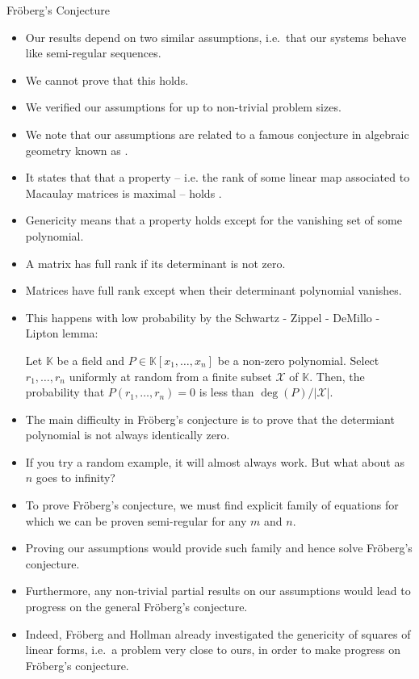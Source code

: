 \documentclass[10pt]{beamer}
\newcommand{\cemph}[1]{{\color{yellow9}{\bf #1}}\xspace}
\begin{document}
\begin{frame}[allowframebreaks]{Fröberg's Conjecture}

\begin{itemize}
  \item Our results depend on two similar assumptions, i.e.\ that our systems behave like semi-regular sequences.
  \item We cannot prove that this holds.
  \item We \cemph{experimentally} verified our assumptions for up to non-trivial problem sizes.
  \item We note that our assumptions are related to a famous conjecture in algebraic geometry known as \cemph{Fr\"oberg's conjecture}.
  \item It states that that a property -- i.e. the rank of some linear map associated to Macaulay matrices is maximal -- holds \cemph{generically}.
  \item Genericity means that a property holds except for the vanishing set of some polynomial.
\framebreak
  \item A matrix has full rank if its determinant is not zero.
  \item Matrices have full rank except when their determinant polynomial vanishes.
  \item This happens with low probability by the Schwartz - Zippel - DeMillo - Lipton lemma:
\begin{lemma}\label{sz}
Let \(\mathbb{K}\) be a  field and \(P\in\mathbb{K}[x_{1},\ldots,x_{n}]\) be a non-zero polynomial. Select \(r_{1},\ldots,r_{n}\) uniformly at random from a finite subset \(\mathcal{X}\) of \(\mathbb{K}\). Then, the probability that \(P(r_{1},\ldots,r_{n})=0\) is less than \(\deg(P)/|\mathcal{X}|\).
\end{lemma}
\framebreak
\item The main difficulty in Fr\"oberg's conjecture is to prove that the determiant polynomial is not always identically zero.
\item If you try a random example, it will almost always work. But what about as $n$ goes to infinity?
\item To prove Fr\"oberg's conjecture, we must find \cemph{one} explicit family of equations for which we can be proven semi-regular for any $m$ and $n$. 

\framebreak
\item Proving our assumptions would provide such family and hence solve Fr\"oberg's conjecture.
\item Furthermore, any non-trivial partial results on our assumptions would lead to progress on the general Fr\"oberg's conjecture.
\item Indeed, Fröberg and Hollman already investigated the genericity of squares of linear forms, i.e.\ a problem very close to ours, in order to make progress on Fröberg's conjecture.
\end{itemize}       


\end{frame}
\end{document}

